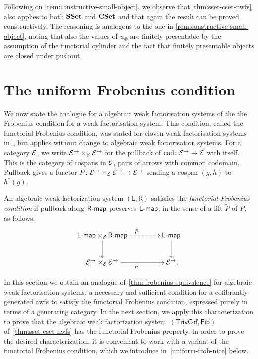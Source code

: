 \documentclass[reqno,10pt,a4paper,oneside,draft]{amsart}
\newcommand{\LL}{\mathsf{L}}
\newcommand{\RR}{\mathsf{R}}
\begin{document}
{{\begin{remark} \label{rem:constructive-small-object}
Following on \cref{rem:constructive-small-object}, we observe that \cref{thm:sset-cset-nwfs} also applies to both $\SSet$ and $\CSet$
and that again the result can be proved constructively. 
The reasoning is analogous to the one in \cref{rem:constructive-small-object}, noting that also the values of $u_\otimes$ are finitely presentable by the assumption of the functorial cylinder and the fact that finitely presentable objects are closed under pushout.
\end{remark} 


\newpage



\section{The uniform Frobenius condition}
\label{sec:frobc}

We now state the analogue for a algebraic weak factorisation systems of the the Frobenius condition for a weak factorisation system.
This condition, called the functorial Frobenius condition, was stated for cloven weak factorisation systems in~\cite{garner:topological-simplicial},
but applies without change to algebraic weak factorisation systems. For a category $\cal{E}$, we write $\cal{E}^\to \times_\cal{E} \cal{E}^\to$
for the pullback of $\cod \co \cal{E}^\to \to \cal{E}$ with itself. This is the category of cospans in
$\cal{E}$, \ie pairs of arrows with common codomain. Pullback gives a functor
$P \co  \cal{E}^\to \times_{\cal{E}} \cal{E}^\to \to \cal{E}^\to$
sending a cospan $(g, h)$ to $h^*(g)$.

\begin{definition} \label{functorial-frobenius}
An algebraic weak factorization system $(\LL, \RR)$ satisfies the \emph{functorial Frobenius condition} if pullback along $\palg{\RR}$
preserves $\pcoalg{\LL}$, in the sense of a lift $\tilde{P}$ of $P$, as follows:
\[
\xymatrix@C+2em{
  \pcoalg{\LL} \times_{\cal{E}} \palg{\RR}
  \ar@{.>}[r]^{\tilde{P}}
  \ar[d]
&
  \pcoalg{\LL}
  \ar[d]
\\
  \cal{E}^\to \times_{\cal{E}} \cal{E}^\to
  \ar[r]_{P}
&
  \cal{E}^\to
\rlap{.}}
\]
\end{definition}

In this section we obtain an analogue of~\cref{thm:frobenius-equivalence} for algebraic weak factorisation systems, \ie 
a necessary and sufficient condition for a cofibrantly generated awfs  to satisfy the functorial Frobenius condition, expressed 
purely in terms of a generating category. In the next section, we apply this characterization  to prove that the algebraic weak 
factorization system~$(\mathsf{TrivCof}, \mathsf{Fib})$ of~\cref{thm:sset-cset-nwfs} has the functorial Frobenius property. 
In order to prove the desired characterization, it is convenient to work with a variant of the functorial Frobenius condition,
which we introduce in~\cref{uniform-frob-nice} below. 

}}
\end{document}
